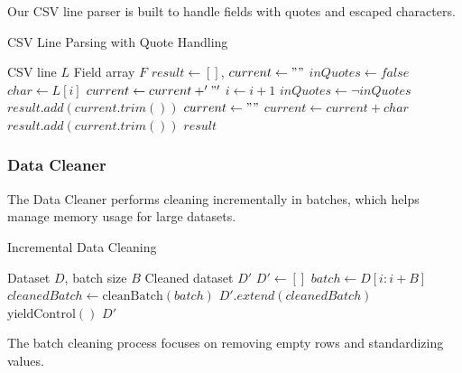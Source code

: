 \documentclass[sigconf]{acmart}
\begin{document}
Our CSV line parser is built to handle fields with quotes and escaped characters.

\begin{algorithm}
\caption{CSV Line Parsing with Quote Handling}
\label{alg:csv-parse}
\begin{algorithmic}[1]
\REQUIRE CSV line $L$
\ENSURE Field array $F$
\STATE $result \leftarrow []$, $current \leftarrow ""$
\STATE $inQuotes \leftarrow false$
    \STATE $char \leftarrow L[i]$
            \STATE $current \leftarrow current + '"'$
            \STATE $i \leftarrow i + 1$ 
        \ELSE
            \STATE $inQuotes \leftarrow \neg inQuotes$
        \ENDIF
        \STATE $result.add(current.trim())$
        \STATE $current \leftarrow ""$
    \ELSE
        \STATE $current \leftarrow current + char$
    \ENDIF
\ENDFOR
\STATE $result.add(current.trim())$
\STATE \RETURN $result$
\end{algorithmic}
\end{algorithm}

\subsubsection{Data Cleaner}

The Data Cleaner performs cleaning incrementally in batches, which helps manage memory usage for large datasets.

\begin{algorithm}
\caption{Incremental Data Cleaning}
\label{alg:data-cleaner}
\begin{algorithmic}[1]
\require Dataset $D$, batch size $B$
\ensure Cleaned dataset $D'$
\STATE $D' \leftarrow []$
    \STATE $batch \leftarrow D[i : i + B]$
    \STATE $cleanedBatch \leftarrow \text{cleanBatch}(batch)$
    \STATE $D'.extend(cleanedBatch)$
        \STATE $\text{yieldControl}()$ 
    \ENDIF
\ENDFOR
\STATE \RETURN $D'$
\end{algorithmic}
\end{algorithm}

The batch cleaning process focuses on removing empty rows and standardizing values.
\end{document}
